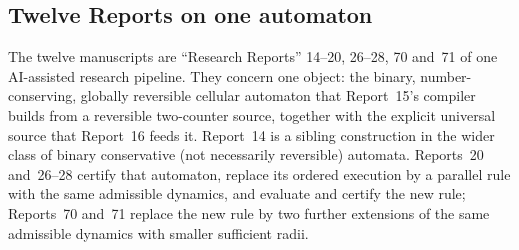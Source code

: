 \documentclass[11pt,a4paper]{article}
\numberwithin{equation}{section}
\begin{document}
\subsection{Twelve Reports on one automaton}\label{fpa:sec:six}
The twelve manuscripts are ``Research Reports'' 14--20, 26--28, 70 and~71 of one AI-assisted research pipeline. They concern one object: the binary, number-conserving, globally reversible cellular automaton that Report~15's compiler builds from a reversible two-counter source, together with the explicit universal source that Report~16 feeds it. Report~14 is a sibling construction in the wider class of binary conservative (not necessarily reversible) automata. Reports~20 and~26--28 certify that automaton, replace its ordered execution by a parallel rule with the same admissible dynamics, and evaluate and certify the new rule; Reports~70 and~71 replace the new rule by two further extensions of the same admissible dynamics with smaller sufficient radii.
\end{document}

